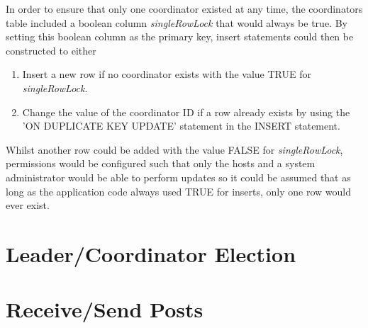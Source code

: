 \documentclass[12pt]{article}
\begin{document}
In order to ensure that only one coordinator existed at any time, the coordinators table included a boolean column \emph{singleRowLock} that would always be true. By setting this boolean column as the primary key, insert statements could then be constructed to either 
\begin{enumerate}
	\item Insert a new row if no coordinator exists with the value TRUE for \emph{singleRowLock}.
	\item Change the value of the coordinator ID if a row already exists by using the 'ON DUPLICATE KEY UPDATE' statement in the INSERT statement.
\end{enumerate}

Whilst another row could be added with the value FALSE for \emph{singleRowLock}, permissions would be configured such that only the hosts and a system administrator would be able to perform updates so it could be assumed that as long as the application code always used TRUE for inserts, only one row would ever exist. 

\section{Leader/Coordinator Election}


\section{Receive/Send Posts}



\end{document}
